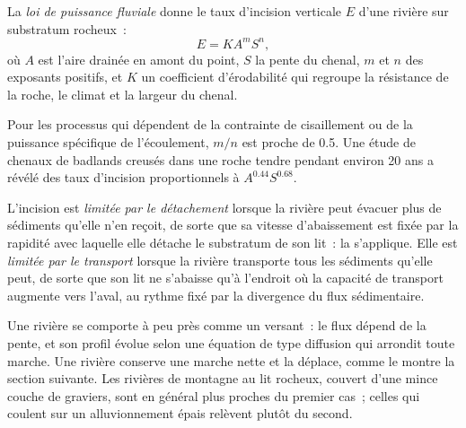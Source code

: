 \begin{definition}\label{def:b3:quantitative-geomorphology:stream-power}
La \emph{loi de puissance fluviale} donne le taux d'incision
verticale $E$ d'une rivière sur substratum rocheux~:
\[
E = K A^m S^n ,
\]
où $A$ est l'aire drainée en amont du point, $S$ la pente du
chenal, $m$ et $n$ des exposants positifs, et $K$ un coefficient d'érodabilité
qui regroupe la résistance de la roche, le climat et la largeur du chenal.
\end{definition}

Pour les processus qui dépendent de la contrainte de cisaillement ou de la puissance
spécifique de l'écoulement, $m/n$ est proche de 0.5. Une étude de chenaux de badlands creusés
dans une roche tendre pendant environ 20 ans a révélé des taux d'incision proportionnels à $A^{0.44}S^{0.68}$.

\begin{definition}\label{def:b3:quantitative-geomorphology:limited}
L'incision est \emph{limitée par le détachement}
lorsque la rivière peut évacuer plus de sédiments qu'elle n'en reçoit, de sorte que sa
vitesse d'abaissement est fixée par la rapidité avec laquelle elle détache le substratum de son lit~: la
 s'applique. Elle est
\emph{limitée par le transport} lorsque la rivière
transporte tous les sédiments qu'elle peut, de sorte que son lit ne s'abaisse qu'à l'endroit où
la capacité de transport augmente vers l'aval, au rythme fixé par la divergence
du flux sédimentaire.
\end{definition}

Une rivière  se comporte à peu près comme un versant~: le flux dépend
de la pente, et son profil évolue selon une équation de type diffusion qui arrondit
toute marche. Une rivière  conserve une marche nette et la déplace,
comme le montre la section suivante. Les rivières de montagne au lit rocheux, couvert d'une
mince couche de graviers, sont en général plus proches du premier cas~; celles qui coulent sur
un alluvionnement épais relèvent plutôt du second.

